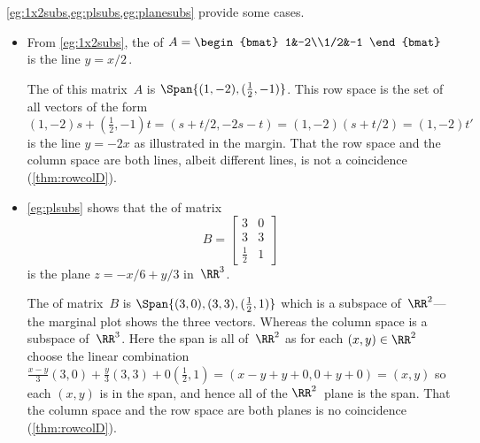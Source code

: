 \begin{example} 
\cref{eg:1x2subs,eg:plsubs,eg:planesubs} provide some cases.
\begin{itemize}
\item From \cref{eg:1x2subs}, the  of \(A=\begin{bmat} 1&-2\\1/2&-1 \end{bmat}\) is the line \(y=x/2\)\,.

The  of this matrix~\(A\) is \(\Span\{(1,-2),(\frac12,-1)\}\).
%
This row space is the set of all vectors of the form \((1,-2)s+(\frac12,-1)t=(s+t/2,-2s-t)=(1,-2)(s+t/2)=(1,-2)t'\) is the line \(y=-2x\) as illustrated in the margin.
That the row space and the column space are both lines, albeit different lines, is not a coincidence (\cref{thm:rowcolD}).

\item \cref{eg:plsubs} shows that the  of matrix
\begin{equation*}
B=\begin{bmatrix} 3&0\\3&3\\\frac12&1 \end{bmatrix}
\end{equation*}
is the plane \(z=-x/6+y/3\) in~\(\RR^3\).

The  of matrix~\(B\) is \(\Span\{(3,0),(3,3),(\frac12,1)\}\) which is a subspace of~\(\RR^2\)---the marginal plot shows the three vectors. 
%
Whereas the column space is a subspace of~\(\RR^3\).
Here the span is all of~\(\RR^2\) as for each \((x,y)\in\RR^2\) choose  the linear combination \(\frac{x-y}3(3,0)+\frac{y}3(3,3)+0(\frac12,1)=(x-y+y+0,0+y+0)=(x,y)\) so each \((x,y)\) is in the span, and hence all of the \(\RR^2\)~plane is the span.
That the column space and the row space are both planes is no coincidence (\cref{thm:rowcolD}).


\end{itemize}
\end{example}
